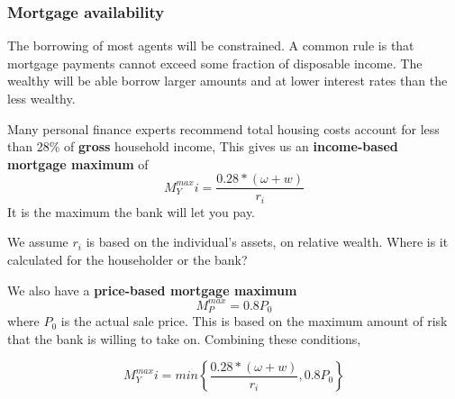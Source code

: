 




 
\subsubsection{Mortgage availability} \label{section-mortgage-availability}
The borrowing of most agents will be constrained. A common rule is that mortgage payments cannot exceed some fraction of disposable income. The wealthy will be able borrow larger amounts and at lower interest rates than the less wealthy.

Many personal finance experts recommend total housing costs account for less than 28\% of \textbf{gross} household income, This gives us an \textbf{income-based  mortgage maximum} of \[M^{max}_Yi = \frac{0.28*(\omega+w)}{r_i}\] It is the maximum the bank will let you pay.

We assume $r_i$ is based on the individual's assets, on relative wealth. Where is it calculated for the householder or the bank?

We also have  a \textbf{price-based mortgage maximum} \[M^{max}_P = 0.8P_0\] where $P_0$ is the actual sale price. This is based on the maximum amount of risk that the bank is willing to take on. Combining these conditions, %

\[M^{max}_Yi = min\left\{\frac{0.28*(\omega+w)}{r_i},  0.8P_0 \right\} \]


